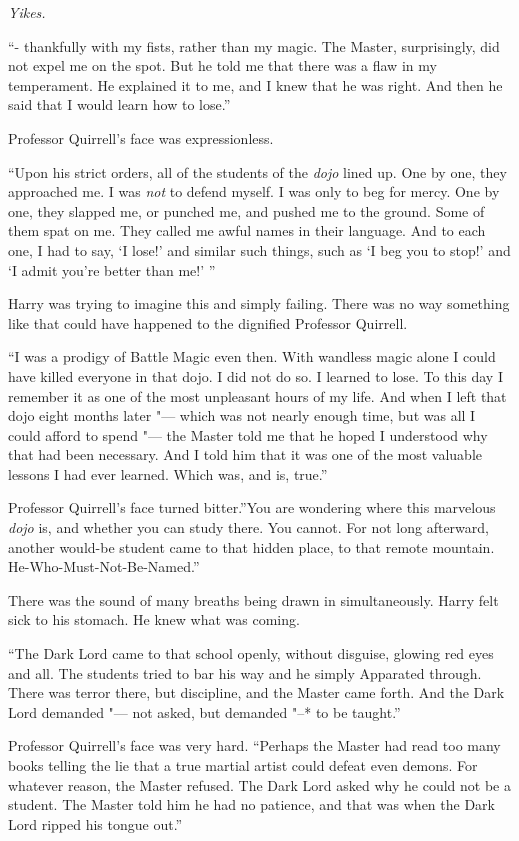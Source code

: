 \emph{Yikes.}

``- thankfully with my fists, rather than my magic. The Master,
surprisingly, did not expel me on the spot. But he told me that there
was a flaw in my temperament. He explained it to me, and I knew that he
was right. And then he said that I would learn how to lose.''

Professor Quirrell's face was expressionless.

``Upon his strict orders, all of the students of the \emph{dojo} lined
up. One by one, they approached me. I was \emph{not} to defend myself. I
was only to beg for mercy. One by one, they slapped me, or punched me,
and pushed me to the ground. Some of them spat on me. They called me
awful names in their language. And to each one, I had to say, `I lose!'
and similar such things, such as `I beg you to stop!' and `I admit
you're better than me!' ''

Harry was trying to imagine this and simply failing. There was no way
something like that could have happened to the dignified Professor
Quirrell.

``I was a prodigy of Battle Magic even then. With wandless magic alone I
could have killed everyone in that dojo. I did not do so. I learned to
lose. To this day I remember it as one of the most unpleasant hours of
my life. And when I left that dojo eight months later "--- which was not
nearly enough time, but was all I could afford to spend "--- the Master
told me that he hoped I understood why that had been necessary. And I
told him that it was one of the most valuable lessons I had ever
learned. Which was, and is, true.''

Professor Quirrell's face turned bitter.''You are wondering where this
marvelous \emph{dojo} is, and whether you can study there. You cannot.
For not long afterward, another would-be student came to that hidden
place, to that remote mountain. He-Who-Must-Not-Be-Named.''

There was the sound of many breaths being drawn in simultaneously. Harry
felt sick to his stomach. He knew what was coming.

``The Dark Lord came to that school openly, without disguise, glowing
red eyes and all. The students tried to bar his way and he simply
Apparated through. There was terror there, but discipline, and the
Master came forth. And the Dark Lord demanded "--- not asked, but demanded
"--* to be taught.''

Professor Quirrell's face was very hard. ``Perhaps the Master had read
too many books telling the lie that a true martial artist could defeat
even demons. For whatever reason, the Master refused. The Dark Lord
asked why he could not be a student. The Master told him he had no
patience, and that was when the Dark Lord ripped his tongue out.''

